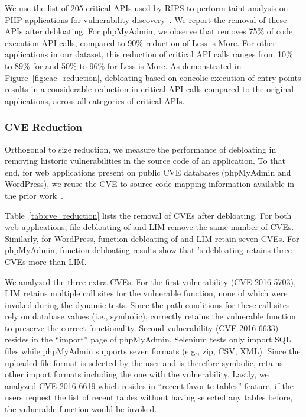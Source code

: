 {We use the list of 205 critical APIs used by RIPS to perform taint analysis on PHP applications for vulnerability discovery~\cite{dahse2010rips}. 
We report the removal of these APIs after debloating. 
For phpMyAdmin, we observe that \animatedead{} removes 75\% of code execution API calls, compared to 90\% reduction of Less is More. 
For other applications in our dataset, this reduction of critical API calls ranges from 10\% to 89\% for \animatedead{} and 50\% to 96\% for Less is More. 
As demonstrated in Figure~\ref{fig:cac_reduction}, debloating based on concolic execution of entry points results in a considerable reduction in critical API calls compared to the original applications, across all categories of critical APIs. 

\subsubsection*{CVE Reduction}
Orthogonal to size reduction, we measure the performance of debloating in removing historic vulnerabilities in the source code of an application. 
To that end, for web applications present on public CVE databases (phpMyAdmin and WordPress), we reuse the CVE to source code mapping information available in the prior work~\cite{azad2019less}.

Table~\ref{tab:cve_reduction} lists the removal of CVEs after debloating. 
For both web applications, file debloating of \animatedead{} and LIM remove the same number of CVEs. 
Similarly, for WordPress, function debloating of \animatedead{} and LIM retain seven CVEs. 
For phpMyAdmin, function debloating results show that \animatedead{}'s debloating retains three CVEs more than LIM. 

We analyzed the three extra CVEs. 
For the first vulnerability (CVE-2016-5703), LIM retains multiple call sites for the vulnerable function, none of which were invoked during the dynamic tests. 
Since the path conditions for these call sites rely on database values (i.e., symbolic), \animatedead{} correctly retains the vulnerable function to preserve the correct functionality. 
Second vulnerability (CVE-2016-6633) resides in the ``import'' page of phpMyAdmin. 
Selenium tests only import SQL files while phpMyAdmin supports seven formats (e.g., zip, CSV, XML). 
Since the uploaded file format is selected by the user and is therefore symbolic, \animatedead{} retains other import formats including the one with the vulnerability. 
Lastly, we analyzed CVE-2016-6619 which resides in ``recent favorite tables'' feature, if the users request the list of recent tables without having selected any tables before, the vulnerable function would be invoked. 

}
